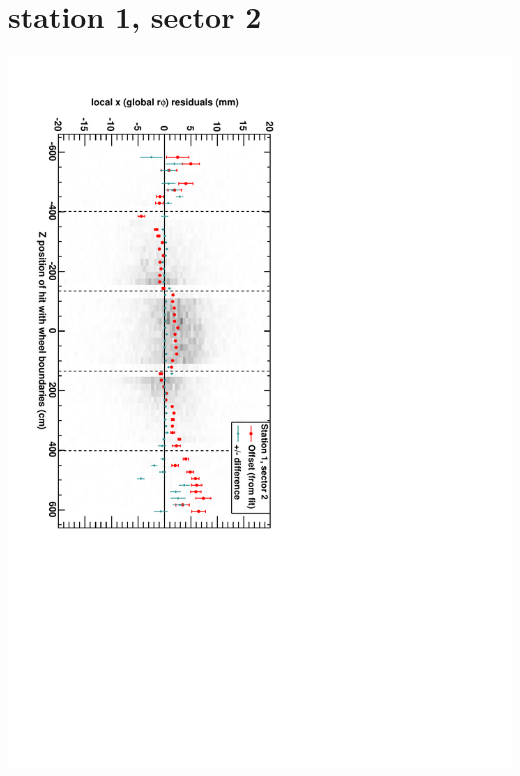 \documentclass[compress]{beamer}
\begin{document}
\section*{station 1, sector 2}
\begin{frame} \vfill \mbox{\hspace{-1 cm}\includegraphics[height=1.2\linewidth, angle=90]{DTrphiVsZ_st1_sr02.pdf}} \end{frame}
\end{document}
